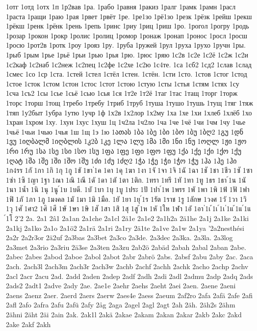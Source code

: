 1отг
1отд
1отх
1п
1р2вав
1ра.
1рабо
1равня
1ракиз
1ралг
1рамк
1рамн
1расл
1раста
1ращи
1раю
1рая
1рвет
1рвёт
1ре.
1ре1зо
1рё1зо
1резк
1рёзк
1рейш
1рекш
1рёкш
1ренк
1рёнк
1рень
1репь
1ринс
1риу
1риц
1риш
1ро.
1рогол
1рогру
1родь
1розар
1рокон
1рокр
1ролис
1ролиц
1ромор
1ронаж
1ронап
1ронос
1росл
1росш
1росю
1рот2в
1ротк
1роу
1рояз
1ру.
1руба
1ружей
1рул
1руха
1рухо
1ручн
1ры.
1рыб
1рым
1рье
1рьё
1рьи
1рью
1рья
1рю.
1рюс
1ряю
1с2в
1с2е
1с2ё
1с2ж
1с2и
1с2каф
1с2наб
1с2неж
1с2пец
1с2фе
1с2хе
1с2ю
1с4те.
1са
1сб2
1сд2
1слав
1слад
1смес
1со
1ср
1ста.
1стей
1стел
1стёл
1стен.
1стён.
1сти
1сто.
1стов
1стог
1стод
1стое
1сток
1стом
1стон
1стос
1стот
1стою
1стую
1сты
1стья
1стям
1стях
1су
1сча
1съ2
1сы
1сье
1сьё
1сью
1сья
1ся
1т2е
1т2ё
1таг
1тас
1тащ
1торг
1торж
1торс
1торш
1тощ
1требо
1требу
1триб
1труб
1туша
1тушо
1тушь
1тущ
1тяг
1тяж
1тяп
1у2быт
1убра
1утю
1учр
1ф
1х2в
1х2лор
1х2му
1ха
1хе
1хи
1хлеб
1хлёб
1хо
1хран
1хром
1ху.
1хун
1хус
1хуш
1ц
1ч2ла
1ч2ло
1ча
1че
1чё
1чи
1чм
1чу
1чье
1чьё
1чьи
1чью
1чья
1ш
1щ
1э
1ю
1ათას
1ბა
1ბე
1ბი
1ბო
1ბუ
1ბღ2
1გუ
1დნ
1ვუ
1იღბალმ
1იღბლის
1კ2ბ
1კე
1ლა
1ლუ
1მა
1მი
1ნი
1ნუ
1ოღლ
1ჟი
1ჟო
1რი
1რუ
1სა
1სე
1სი
1სო
1სუ
1ფა
1ფე
1ფი
1ფო
1ფუ
1ქა
1ქე
1ქი
1ქო
1ქუ
1ღატ
1შა
1შე
1ში
1შო
1შუ
1ძი
1ძუ
1ძღ2
1ჭა
1ჭე
1ჭი
1ჭო
1ჭუ
1ჰა
1ჰე
1ჰი
1ก4รร
1กั
1กา
1กิ
1กุ
1กู
1ขั
1ขา
่1ค
1คา
1คุ
1ฆา
1งา
1จั
1จา
1จิ
1ฉั
1ฉา
1ชั
1ชา
1ชีว
1ซั
1ซา
1ซ่า
1ซิ
1ญา
1ฐา
1ณา
1ณิ
1ณี
1ดั
1ดา
1ตั
1ตา
1ติก.
1ทรา
1ทรี
1ทั
1ทา
1ทู
1ธร
1ธา
์1น
1นั
1นา
1น้ำ
1นิ
1นุ
1นู
์1บ
1บดี.
1บั
1บา
1บุ
1บู
1ประ
1ปั
1ปา
์1พ
1พรร
1พั
1พา
1พิ
1ฟ้
1ฟั
1ฟา
1ฟิ
1ภั
1ภา
1ภู
1มงคล
1มั
1มา
1มิ
1มือ.
1ยั
1ยา
1ยุ
์1ร
1รัต
1ราช
1รู
1ลักษ
1วงศ
1วั
1วา
1วิ
1วุ
1ศั
1ศา2
1ศิ
1ศึ
1ษั
1ษา
1ษิ
1สั
1สา
1สิ
1สุ
1สู
้1ห
1หั
1ให
1ฬา
1อั
1อา
่1เ
้1เ
์1เ
่1แ
้1แ
์1แ
์1โ
2'2
2a.
2a1
2â1
2a1an
2a1che
2a1cl
2ä1e
2a1e2
2a1h2a
2ä1he
2a1j
2a1ke
2a1ki
2a1kj
2a1ko
2a1o
2a1ö2
2a1rä
2a1ri
2a1ry
2ä1te
2a1ve
2a1w
2a1ya
'2a2nesthési
2a2r
2a2r3or
2ä2uf
2a3bas
2a3bet
2a3co
2a3de.
2a3dec
2a3ka.
2a3la.
2a3log
2a3met
2a3rio
2a3riu
2ä3se
2a3ten
2a3zu
2ab2ö
2abäd
2abah
2abal
2aban
2abe.
2abec
2abes
2abod
2aboe
2abol
2abot
2abr
2abrö
2abs.
2absf
2abu
2aby
2ac.
2aca
2ach.
2ach3l
2ach3m
2ach3r
2ach3w
2achb
2achf
2achh
2achk
2acho
2achp
2achv
2acl
2acr
2acu
2ad.
2add
2aden
2adep
2adf
2adh
2adi
2adl
2admu
2adp
2adq
2ads
2ads2
2adt1
2adve
2ady
2ae.
2ae1e
2aehr
2aehs
2aeht
2aei
2aen.
2aene
2aeni
2aens
2aenz
2aer.
2aerd
2aers
2aerw
2aes4e
2aess
2aeum
2af2ro
2afa
2afä
2afe
2afi
2afl
2afo
2afra
2afu
2afü
2afy
2åg
2aga
2agel
2agl
2agt
2ah
2äh.
2äh2s
2ähm
2ähni
2äht
2äi
2ain
2ak.
2ak1l
2akä
2akae
2akam
2akan
2akar
2akb
2akc
2akd
2ake
2akf
2akh
